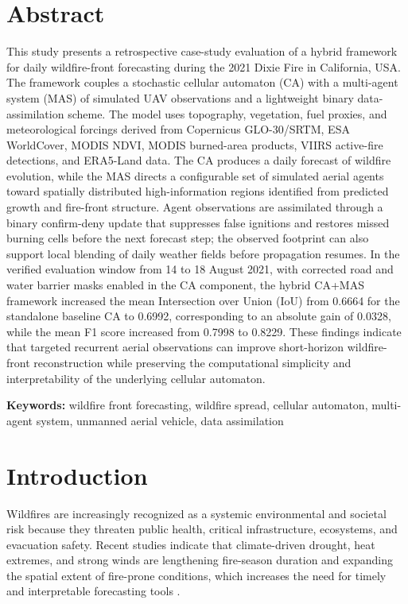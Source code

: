 \documentclass[10pt,letterpaper]{article}
\begin{document}
\section*{Abstract}
This study presents a retrospective case-study evaluation of a hybrid framework for daily wildfire-front forecasting during the 2021 Dixie Fire in California, USA. The framework couples a stochastic cellular automaton (CA) with a multi-agent system (MAS) of simulated UAV observations and a lightweight binary data-assimilation scheme. The model uses topography, vegetation, fuel proxies, and meteorological forcings derived from Copernicus GLO-30/SRTM, ESA WorldCover, MODIS NDVI, MODIS burned-area products, VIIRS active-fire detections, and ERA5-Land data. The CA produces a daily forecast of wildfire evolution, while the MAS directs a configurable set of simulated aerial agents toward spatially distributed high-information regions identified from predicted growth and fire-front structure. Agent observations are assimilated through a binary confirm-deny update that suppresses false ignitions and restores missed burning cells before the next forecast step; the observed footprint can also support local blending of daily weather fields before propagation resumes. In the verified evaluation window from 14 to 18 August 2021, with corrected road and water barrier masks enabled in the CA component, the hybrid CA+MAS framework increased the mean Intersection over Union (IoU) from 0.6664 for the standalone baseline CA to 0.6992, corresponding to an absolute gain of 0.0328, while the mean F1 score increased from 0.7998 to 0.8229. These findings indicate that targeted recurrent aerial observations can improve short-horizon wildfire-front reconstruction while preserving the computational simplicity and interpretability of the underlying cellular automaton.

\noindent\textbf{Keywords:} wildfire front forecasting, wildfire spread, cellular automaton, multi-agent system, unmanned aerial vehicle, data assimilation

\clearpage
{}
\linenumbers
\section*{Introduction}

Wildfires are increasingly recognized as a systemic environmental and
societal risk because they threaten public health, critical
infrastructure, ecosystems, and evacuation safety. Recent studies
indicate that climate-driven drought, heat extremes, and strong winds
are lengthening fire-season duration and expanding the spatial extent of
fire-prone conditions, which increases the need for timely and
interpretable forecasting tools \cite{jolly2015,shaik2025}.
\end{document}
